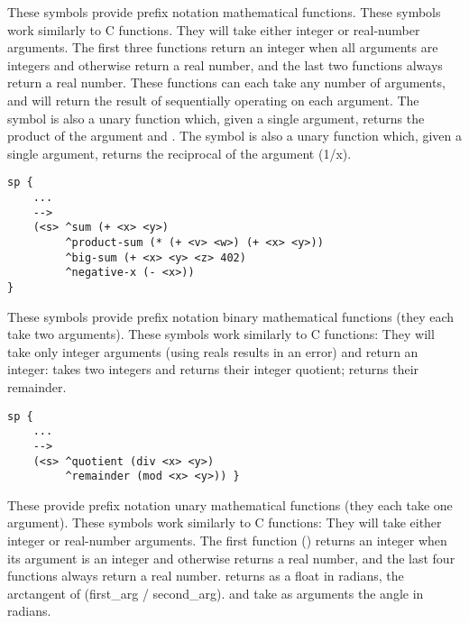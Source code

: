 \begin{description}
\item [\soarb{+, -, *, /} --- ]
        These symbols provide prefix notation mathematical functions.
        These symbols work similarly to C functions.  They will take either 
        integer or real-number arguments. The first three functions return 
        an integer when all arguments are integers
        and otherwise return a real number, and the last two functions
        always return a real number. These functions can each take any number of arguments,
        and will return the result of sequentially operating on each argument.
        The \soar{-} symbol is also a
	unary function which, given a single argument, returns the
	product of the argument and .  The \soar{/} symbol is
	also a unary function which, given a single argument, returns the
	reciprocal of the argument (1/x).

\begin{verbatim}
sp {
    ...
    -->
    (<s> ^sum (+ <x> <y>)
         ^product-sum (* (+ <v> <w>) (+ <x> <y>))
         ^big-sum (+ <x> <y> <z> 402)
         ^negative-x (- <x>))
}
\end{verbatim}

\item [\soarb{div, mod} --- ]
        These symbols provide prefix notation binary mathematical functions
        (they each take two arguments). These symbols work similarly to C
        functions: They will take only integer arguments (using reals results
        in an error) and return an integer:  takes two integers and
        returns their integer quotient;  returns their remainder.

\begin{verbatim}
sp {
    ...
    -->
    (<s> ^quotient (div <x> <y>)
         ^remainder (mod <x> <y>)) }
\end{verbatim}

\item [\soarb{abs, atan2, sqrt, sin, cos} --- ]   
        These provide prefix notation unary 
        mathematical functions (they each take one argument). 
        These symbols work similarly to C functions:
        They will take either integer or real-number arguments. The
        first function () returns an integer when its argument is an
        integer and otherwise returns a real number, and the last four
        functions always return a real number.   returns as
	a float in radians, the arctangent of (first\_arg / second\_arg).
	 and  take as arguments the angle in radians.


\end{description}
